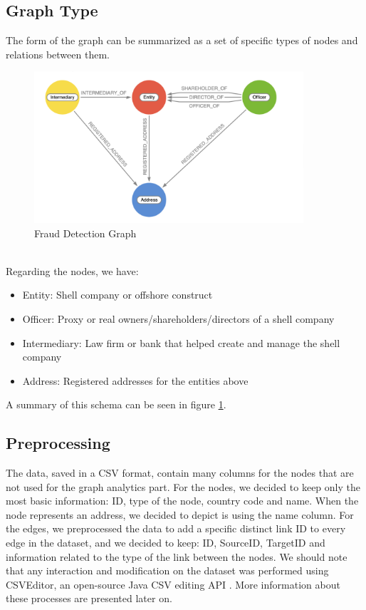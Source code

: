 \documentclass[sigconf, nonacm]{acmart}
\begin{document}
\subsection{Graph Type} 
The form of the graph can be summarized as a set of specific types of nodes and relations between them.\\
\begin{figure}[htp]
    \centering
    \includegraphics[width=10cm]{figures/graphType.png}
    \caption{Fraud Detection Graph}
    \label{fig:graph-type}
\end{figure}\\
Regarding the nodes, we have:
\begin{itemize}
    \item Entity: Shell company or offshore construct
    \item Officer: Proxy or real owners/shareholders/directors of a shell company
    \item Intermediary: Law firm or bank that helped create and manage the shell company
    \item Address: Registered addresses for the entities above
\end{itemize}
A summary of this schema can be seen in figure \ref{fig:graph-type}.

\subsection{Preprocessing}
The data, saved in a CSV format, contain many columns for the nodes that are not used for the graph analytics part. For the nodes, we decided to keep only the most basic information: ID, type of the node, country code and name. When the node represents an address, we decided to depict is using the name column. For the edges, we preprocessed the data to add a specific distinct link ID to every edge in the dataset, and we decided to keep: ID, SourceID, TargetID and information related to the type of the link between the nodes. We should note that any interaction and modification on the dataset was performed using CSVEditor, an open-source Java CSV editing API \cite{csvEditor}. More information about these processes are presented later on.
\end{document}
